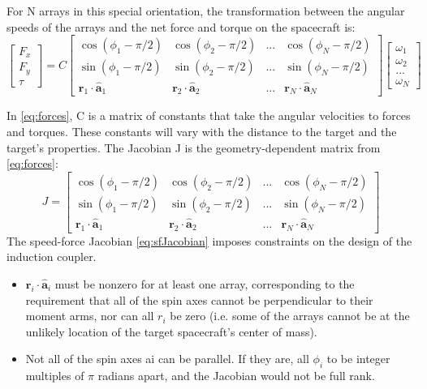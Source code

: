 
%

%


For N arrays in this special orientation, the transformation between the angular speeds of the arrays and the net force and torque on the spacecraft is:
\begin{equation}\label{eq:forces}
 \begin{bmatrix} F_x\\F_y\\\tau \end{bmatrix} = C\begin{bmatrix} \cos{(\phi_1 -\pi/2)} & \cos{(\phi_2 -\pi/2)} & ... & \cos{(\phi_N -\pi/2)} \\
\sin{(\phi_1 -\pi/2)} & \sin{(\phi_2 -\pi/2)} & ... & \sin{(\phi_N -\pi/2)} 
\\\textbf{r}_1\cdot \hat{\textbf{a}}_1 & \textbf{r}_2 \cdot \hat{\textbf{a}}_2 & ... & \textbf{r}_N \cdot \hat{\textbf{a}}_N \end{bmatrix}
\begin{bmatrix} \omega_1\\\omega_2\\...\\\omega_N \end{bmatrix}
\end{equation}

In \ref{eq:forces}, C is a matrix of constants that take the angular velocities to forces and torques. These constants will vary with ‎the‎ distance ‎to‎ the ‎target ‎and ‎the ‎target’s‎ properties.
The Jacobian J is the geometry-dependent matrix from \ref{eq:forces}:
\begin{equation}\label{eq:sfJacobian}
J = \begin{bmatrix} \cos{(\phi_1 -\pi/2)} & \cos{(\phi_2 -\pi/2)} & ... & \cos{(\phi_N -\pi/2)} \\
\sin{(\phi_1 -\pi/2)} & \sin{(\phi_2 -\pi/2)} & ... & \sin{(\phi_N -\pi/2)} 
\\\textbf{r}_1\cdot \hat{\textbf{a}}_1 & \textbf{r}_2 \cdot \hat{\textbf{a}}_2 & ... & \textbf{r}_N \cdot \hat{\textbf{a}}_N \end{bmatrix} 
\end{equation}
The speed-force Jacobian \ref{eq:sfJacobian}  imposes constraints on the design of the induction coupler.

\begin{itemize}
\item  $ \textbf{r}_i \cdot \hat{\textbf{a}}_i $ must be nonzero for at least one array, corresponding to the requirement that all of the spin axes cannot be perpendicular to their moment arms, nor can all $r_i$ be zero (i.e. some of the arrays cannot be at the unlikely location of the target spacecraft's center of mass).
\item  Not all of the spin axes ai can be parallel. If they are, all $\phi_i$ to be integer multiples of $\pi$ radians ‎apart, and the Jacobian would not be full rank.
\end{itemize}

